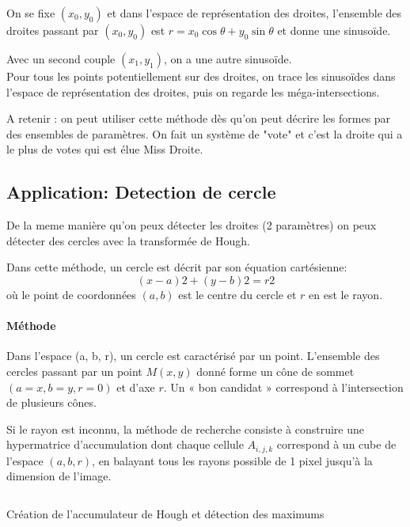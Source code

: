 \documentclass[main.tex]{subfiles}
\begin{document}
On se fixe $(x_0,y_0)$ et dans l'espace de représentation des droites, l'ensemble des droites passant par $(x_0,y_0)$ est $r=x_0\cos\theta + y_0\sin\theta$ et donne une sinusoïde.

Avec un second couple $(x_1,y_1)$, on a une autre sinusoïde.\\

Pour tous les points potentiellement sur des droites, on trace les sinusoïdes dans l'espace de représentation des droites, puis on regarde les méga-intersections.

A retenir : on peut utiliser cette méthode dès qu'on peut décrire les formes par des ensembles de paramètres. On fait un système de "vote" et c'est la droite qui a le plus de votes qui est élue Miss Droite.


\subsection{Application: Detection de cercle}

De la meme manière qu'on peux détecter les droites (2 paramètres) on peux détecter des cercles avec la transformée de Hough.

\begin{defin}
  Dans cette méthode, un cercle est décrit par son équation cartésienne:
\[
    (x- a)2 + (y- b)2 = r2
\]
où le point de coordonnées $(a, b)$ est le centre du cercle et $r$ en est le rayon.
\end{defin}

\paragraph{Méthode}

Dans l'espace (a, b, r), un cercle est caractérisé par un point. L'ensemble des cercles passant par un point $M(x, y)$ donné forme un cône de sommet $(a = x, b = y, r = 0)$ et d'axe $r$. Un « bon candidat » correspond à l'intersection de plusieurs cônes.


Si le rayon est inconnu, la méthode de recherche consiste à construire une hypermatrice d'accumulation dont chaque cellule $A_{i, j, k}$ correspond à un cube de l'espace $(a, b, r)$, en balayant tous les rayons possible de 1 pixel jusqu'à la dimension de l'image.

\begin{listing}
  \inputminted{python}{hough.py}
  \caption{Création de l'accumulateur de Hough et détection des maximums}
\end{listing}
\end{document}
